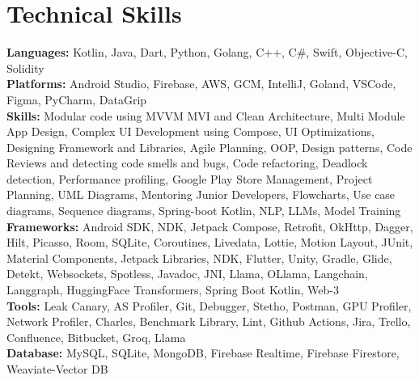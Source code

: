 \documentclass[11pt,a4paper]{article}
\begin{document}
\section{Technical Skills}
\begin{itemize}[leftmargin=0.15in, label={}]
    \small{\item{
     \textbf{Languages: }{Kotlin, Java, Dart, Python, Golang, C++, C\#, Swift, Objective-C, Solidity} \\
     \textbf{Platforms: }{Android Studio, Firebase, AWS, GCM, IntelliJ, Goland, VSCode, Figma, PyCharm, DataGrip} \\
     \textbf{Skills: }{Modular code using MVVM MVI and Clean Architecture, Multi Module App Design, Complex UI Development using Compose, UI Optimizations, Designing Framework and Libraries, Agile Planning, OOP, Design patterns, Code Reviews and detecting code smells and bugs, Code refactoring, Deadlock detection, Performance profiling, Google Play Store Management, Project Planning, UML Diagrams, Mentoring Junior Developers, Flowcharts, Use case diagrams, Sequence diagrams, Spring-boot Kotlin, NLP, LLMs, Model Training} \\
     \textbf{Frameworks: }{Android SDK, NDK, Jetpack Compose, Retrofit, OkHttp, Dagger, Hilt, Picasso, Room, SQLite, Coroutines, Livedata, Lottie, Motion Layout, JUnit, Material Components, Jetpack Libraries, NDK, Flutter, Unity, Gradle, Glide, Detekt, Websockets, Spotless, Javadoc, JNI, Llama, OLlama, Langchain, Langgraph, HuggingFace Transformers, Spring Boot Kotlin, Web-3} \\
     \textbf{Tools: }{Leak Canary, AS Profiler, Git, Debugger, Stetho, Postman, GPU Profiler, Network Profiler, Charles, Benchmark Library, Lint, Github Actions, Jira, Trello, Confluence, Bitbucket, Groq, Llama} \\
     \textbf{Database: }{MySQL, SQLite, MongoDB, Firebase Realtime, Firebase Firestore, Weaviate-Vector DB}
    }}
\end{itemize}

\end{document}

